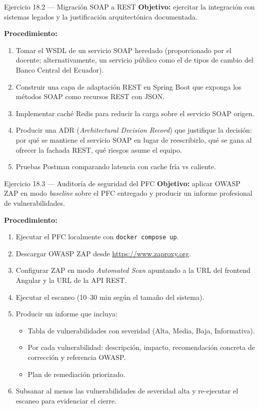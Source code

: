 \begin{cajaejercicio}{Ejercicio 18.2 --- Migración SOAP a REST}
\textbf{Objetivo:} ejercitar la integración con sistemas legados
y la justificación arquitectónica documentada.

\textbf{Procedimiento:}
\begin{enumerate}
\item Tomar el WSDL de un servicio SOAP heredado (proporcionado por
el docente; alternativamente, un servicio público como el de tipos de
cambio del Banco Central del Ecuador).
\item Construir una capa de adaptación REST en Spring Boot que
exponga los métodos SOAP como recursos REST con JSON.
\item Implementar caché Redis para reducir la carga sobre el servicio
SOAP origen.
\item Producir una ADR (\emph{Architectural Decision Record}) que
justifique la decisión: por qué se mantiene el servicio SOAP
en lugar de reescribirlo, qué se gana al ofrecer la fachada REST,
qué riesgos asume el equipo.
\item Pruebas Postman comparando latencia con cache fría vs caliente.
\end{enumerate}
\end{cajaejercicio}

\begin{cajaejercicio}{Ejercicio 18.3 --- Auditoría de seguridad del PFC}
\textbf{Objetivo:} aplicar OWASP ZAP en modo \emph{baseline} sobre el
PFC entregado y producir un informe profesional de vulnerabilidades.

\textbf{Procedimiento:}
\begin{enumerate}
\item Ejecutar el PFC localmente con \texttt{docker compose up}.
\item Descargar OWASP ZAP desde \url{https://www.zaproxy.org}.
\item Configurar ZAP en modo \emph{Automated Scan} apuntando a la URL
del frontend Angular y la URL de la API REST.
\item Ejecutar el escaneo (10--30 min según el tamaño del sistema).
\item Producir un informe que incluya:
\begin{itemize}
\item Tabla de vulnerabilidades con severidad (Alta, Media, Baja,
Informativa).
\item Por cada vulnerabilidad: descripción, impacto, recomendación
concreta de corrección y referencia OWASP.
\item Plan de remediación priorizado.
\end{itemize}
\item Subsanar al menos las vulnerabilidades de severidad alta y
re-ejecutar el escaneo para evidenciar el cierre.
\end{enumerate}
\end{cajaejercicio}

